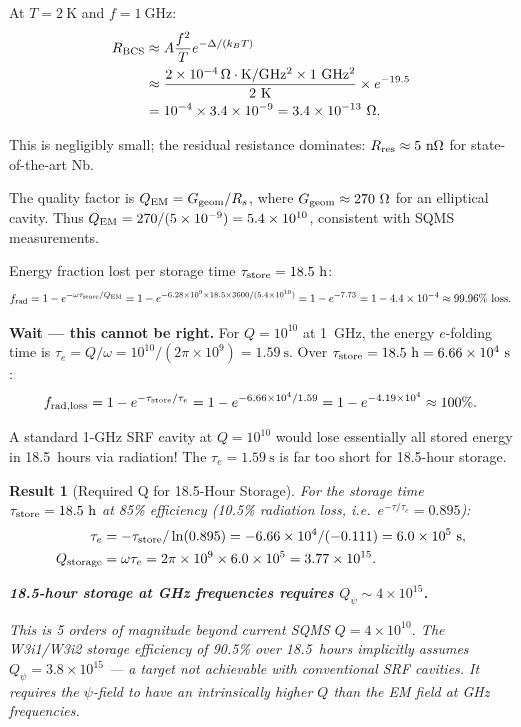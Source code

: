 \documentclass[aps,prd,twocolumn,superscriptaddress]{revtex4-2}
\newtheorem{result}{Result}
\begin{document}
At $T = 2~\mathrm{K}$ and $f = 1~\mathrm{GHz}$:
\begin{align}
R_{\rm BCS} &\approx A\frac{f^2}{T}e^{-\Delta/(k_B T)} \notag\\
&\approx \frac{2\times 10^{-4}\,\Omega\cdot\mathrm{K/GHz^2}
\times 1~\mathrm{GHz^2}}{2~\mathrm{K}}
\times e^{-19.5} \notag\\
&= 10^{-4}\times 3.4\times 10^{-9} = 3.4\times 10^{-13}~\Omega.
\end{align}

This is negligibly small; the residual resistance dominates:
$R_{\rm res} \approx 5~\mathrm{n\Omega}$ for state-of-the-art Nb.

The quality factor is $Q_{\rm EM} = G_{\rm geom}/R_s$, where
$G_{\rm geom} \approx 270~\Omega$ for an elliptical cavity.
Thus $Q_{\rm EM} = 270/(5\times 10^{-9}) = 5.4\times 10^{10}$,
consistent with SQMS measurements.

Energy fraction lost per storage time $\tau_{\rm store} = 18.5~\mathrm{h}$:
\begin{equation}
f_{\rm rad} = 1 - e^{-\omega\tau_{\rm store}/Q_{\rm EM}}
= 1 - e^{-6.28\times 10^9\times 18.5\times 3600/(5.4\times 10^{10})}
= 1 - e^{-7.73} = 1 - 4.4\times 10^{-4} \approx 99.96\%~\text{loss}.
\end{equation}

\textbf{Wait --- this cannot be right.}  For $Q = 10^{10}$ at 1~GHz,
the energy $e$-folding time is $\tau_e = Q/\omega = 10^{10}/(2\pi\times 10^9) = 1.59~\mathrm{s}$.
Over $\tau_{\rm store} = 18.5~\mathrm{h} = 6.66\times 10^4~\mathrm{s}$:
\begin{equation}
f_{\rm rad,loss} = 1 - e^{-\tau_{\rm store}/\tau_e}
= 1 - e^{-6.66\times 10^4/1.59} = 1 - e^{-4.19\times 10^4} \approx 100\%.
\end{equation}

A standard 1-GHz SRF cavity at $Q = 10^{10}$ would lose essentially
all stored energy in 18.5~hours via radiation!  The $\tau_e = 1.59~\mathrm{s}$
is far too short for 18.5-hour storage.

\begin{result}[Required Q for 18.5-Hour Storage]
For the storage time $\tau_{\rm store} = 18.5~\mathrm{h}$ at 85\%
efficiency (10.5\% radiation loss, i.e.\ $e^{-\tau/\tau_e} = 0.895$):
\begin{align}
\tau_e &= -\tau_{\rm store}/\ln(0.895)
= -6.66\times 10^4/(-0.111)
= 6.0\times 10^5~\mathrm{s}, \\
Q_{\rm storage} &= \omega\tau_e
= 2\pi\times 10^9\times 6.0\times 10^5
= 3.77\times 10^{15}.
\end{align}

\textbf{18.5-hour storage at GHz frequencies requires $Q_\psi \sim 4\times 10^{15}$.}

This is 5 orders of magnitude beyond current SQMS $Q = 4\times 10^{10}$.
The W3i1/W3i2 storage efficiency of 90.5\% over 18.5~hours
implicitly assumes $Q_\psi = 3.8\times 10^{15}$ --- a target not
achievable with conventional SRF cavities.  It requires the
$\psi$-field to have an intrinsically higher $Q$ than the EM field
at GHz frequencies.
\end{result}
\end{document}
